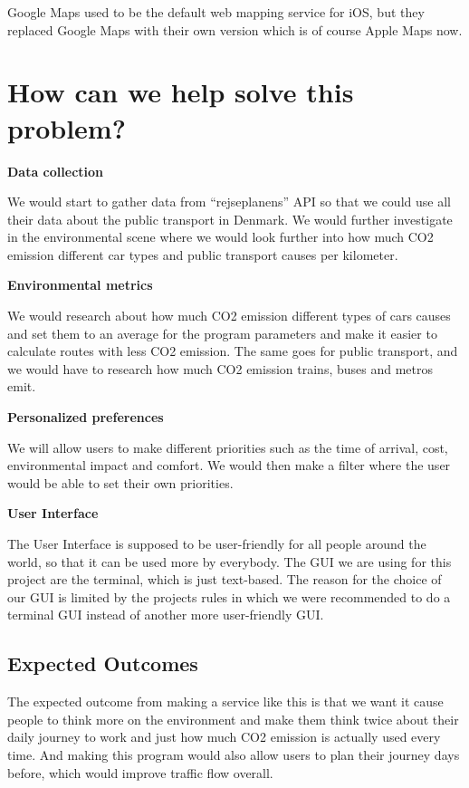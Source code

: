 \documentclass[11pt]{article}
\begin{document}
    Google Maps used to be the default web mapping service for iOS, but they replaced Google Maps with their own version
    which is of course Apple Maps now. \cite{AppleMapsWiki} \newline


    \section{How can we help solve this problem?}\label{sec:how-can-we-help-solve-this-problem?}

    \textbf{Data collection}

    We would start to gather data from ``rejseplanens'' API so that we could use all their data about the public
    transport in Denmark.
    We would further investigate in the environmental scene where we would look further into how much CO2 emission
    different car types and public transport causes per kilometer.

    \textbf{Environmental metrics}

    We would research about how much CO2 emission different types of cars causes and set them to an average for the
    program parameters and make it easier to calculate routes with less CO2 emission.
    The same goes for public transport, and we would have to research how much CO2 emission trains, buses and metros
    emit.

    \textbf{Personalized preferences}

    We will allow users to make different priorities such as the time of arrival, cost, environmental impact and
    comfort.
    We would then make a filter where the user would be able to set their own priorities.

    \textbf{User Interface}

    The User Interface is supposed to be user-friendly for all people around the world, so that it can be used more by
    everybody.
    The GUI we are using for this project are the terminal, which is just text-based.
    The reason for the choice of our GUI is limited by the projects rules in which we were recommended to do a terminal
    GUI instead of another more user-friendly GUI.

    \subsection{Expected Outcomes}\label{subsec:expected-outcomes}

    The expected outcome from making a service like this is that we want it cause people to think more on the
    environment and make them think twice about their daily journey to work and just how much CO2 emission is actually
    used every time.
    And making this program would also allow users to plan their journey days before, which would improve traffic flow
    overall.


    
\end{document}
